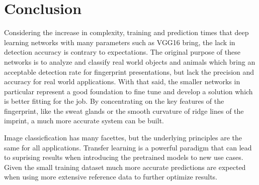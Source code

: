 
\section{Conclusion}
Considering the increase in complexity, training and prediction times that deep learning networks with many parameters such as VGG16 bring, the lack in detection accuracy is contrary to expectations.
The original purpose of these networks is to analyze and classify real world objects and animals which bring an acceptable detection rate for fingerprint presentations, but lack the precision and accuracy for real world applications.
With that said, the smaller networks in particular represent a good foundation to fine tune and develop a solution which is better fitting for the job.
By concentrating on the key features of the fingerprint, like the sweat glands or the smooth curvature of ridge lines of the imprint, a much more accurate system can be built.

\medskip\noindent
Image classicfication has many facettes, but the underlying principles are the same for all applications.
Transfer learning is a powerful paradigm that can lead to suprising results when introducing the pretrained models to new use cases.
Given the small training dataset much more accurate predictions are expected when using more extensive reference data to further optimize results.

